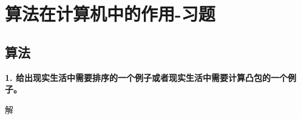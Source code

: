 \chapter{算法在计算机中的作用-习题}
\section{算法}

\textbf{1. 给出现实生活中需要排序的一个例子或者现实生活中需要计算凸包的一个例子。}
\begin{flushleft}
解
\end{flushleft}


